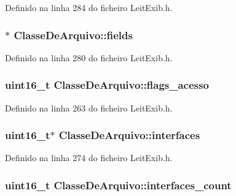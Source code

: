 Definido na linha 284 do ficheiro Leit\-Exib.\-h.

\hypertarget{struct_classe_de_arquivo_a0a756640d8c9a35fb2068e4da70b0f9a}{
\subsubsection[{fields}]{$\ast$ Classe\-De\-Arquivo\-::fields}}\label{struct_classe_de_arquivo_a0a756640d8c9a35fb2068e4da70b0f9a}


Definido na linha 280 do ficheiro Leit\-Exib.\-h.

\hypertarget{struct_classe_de_arquivo_a113235ae98d51c48780e11d39debf99f}{
\subsubsection[{flags\-\_\-acesso}]{\setlength{\rightskip}{0pt plus 5cm}uint16\-\_\-t Classe\-De\-Arquivo\-::flags\-\_\-acesso}}\label{struct_classe_de_arquivo_a113235ae98d51c48780e11d39debf99f}


Definido na linha 263 do ficheiro Leit\-Exib.\-h.

\hypertarget{struct_classe_de_arquivo_a7ab7e89f230794a963028b0e827ef878}{
\subsubsection[{interfaces}]{\setlength{\rightskip}{0pt plus 5cm}uint16\-\_\-t$\ast$ Classe\-De\-Arquivo\-::interfaces}}\label{struct_classe_de_arquivo_a7ab7e89f230794a963028b0e827ef878}


Definido na linha 274 do ficheiro Leit\-Exib.\-h.

\hypertarget{struct_classe_de_arquivo_a81969140a877d9eb2eda7616c58e2a4d}{
\subsubsection[{interfaces\-\_\-count}]{\setlength{\rightskip}{0pt plus 5cm}uint16\-\_\-t Classe\-De\-Arquivo\-::interfaces\-\_\-count}}\label{struct_classe_de_arquivo_a81969140a877d9eb2eda7616c58e2a4d}


